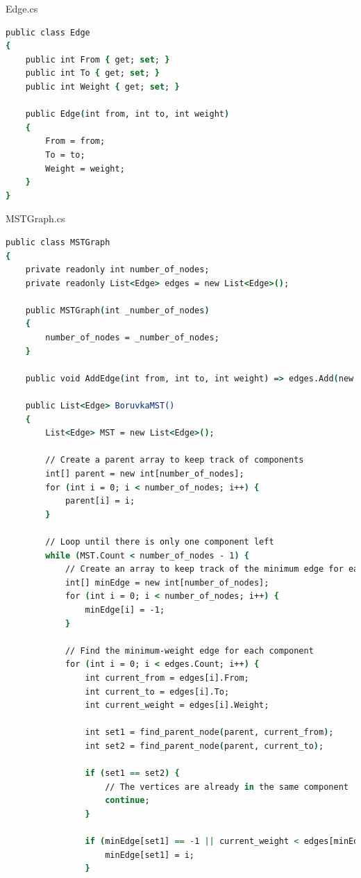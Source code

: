 \documentclass[11pt]{article}
\begin{document}
\medbreak\noindent
Edge.cs
\begin{lstlisting}[language=csh]
public class Edge
{
    public int From { get; set; }
    public int To { get; set; }
    public int Weight { get; set; }

    public Edge(int from, int to, int weight)
    {
        From = from;
        To = to;
        Weight = weight;
    }
}
\end{lstlisting}

\medbreak\noindent
MSTGraph.cs
\begin{lstlisting}[language=csh]
public class MSTGraph
{
    private readonly int number_of_nodes;
    private readonly List<Edge> edges = new List<Edge>();

    public MSTGraph(int _number_of_nodes)
    {
        number_of_nodes = _number_of_nodes;
    }

    public void AddEdge(int from, int to, int weight) => edges.Add(new Edge(from, to, weight));

    public List<Edge> BoruvkaMST()
    {
        List<Edge> MST = new List<Edge>();

        // Create a parent array to keep track of components
        int[] parent = new int[number_of_nodes];
        for (int i = 0; i < number_of_nodes; i++) {
            parent[i] = i;
        }

        // Loop until there is only one component left
        while (MST.Count < number_of_nodes - 1) {
            // Create an array to keep track of the minimum edge for each component
            int[] minEdge = new int[number_of_nodes];
            for (int i = 0; i < number_of_nodes; i++) {
                minEdge[i] = -1;
            }

            // Find the minimum-weight edge for each component
            for (int i = 0; i < edges.Count; i++) {
                int current_from = edges[i].From;
                int current_to = edges[i].To;
                int current_weight = edges[i].Weight;

                int set1 = find_parent_node(parent, current_from);
                int set2 = find_parent_node(parent, current_to);

                if (set1 == set2) {
                    // The vertices are already in the same component
                    continue;
                }

                if (minEdge[set1] == -1 || current_weight < edges[minEdge[set1]].Weight) {
                    minEdge[set1] = i;
                }


\end{lstlisting}
\end{document}
